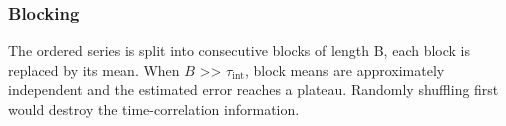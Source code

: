 \subsubsection{Blocking}
The ordered series is split into consecutive blocks of length B, each block is replaced by its mean. When $B$ >> $\tau_{\mathrm{int}}$, block means are approximately independent and
the estimated error reaches a plateau. Randomly shuffling first would destroy the time-correlation
information.




